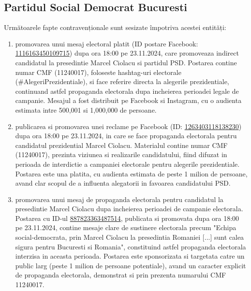 \documentclass[a4paper,12pt]{article}
\begin{document}
\subsection{Partidul Social Democrat Bucuresti}
Următoarele fapte contravenționale sunt sesizate împotriva acestei entități:

\begin{enumerate}[leftmargin=*, label=\arabic*.)]
    \item promovarea unui mesaj electoral platit (ID postare Facebook: \href{https://www.facebook.com/ads/library/?id=1116163450109715}{1116163450109715}) dupa ora 18:00 pe 23.11.2024, care promoveaza indirect candidatul la presedintie Marcel Ciolacu si partidul PSD. Postarea contine numar CMF (11240017), foloseste hashtag-uri electorale (\#AlegeriPrezidentiale), si face referire directa la alegerile prezidentiale, continuand astfel propaganda electorala dupa incheierea perioadei legale de campanie. Mesajul a fost distribuit pe Facebook si Instagram, cu o audienta estimata intre 500,001 si 1,000,000 de persoane.
    \item publicarea si promovarea unei reclame pe Facebook (ID: \href{https://www.facebook.com/ads/library/?id=1263403118138230}{1263403118138230}) dupa ora 18:00 pe 23.11.2024, in care se face propaganda electorala pentru candidatul prezidential Marcel Ciolacu. Materialul contine numar CMF (11240017), prezinta viziunea si realizarile candidatului, fiind difuzat in perioada de interdictie a campaniei electorale pentru alegerile prezidentiale. Postarea este una platita, cu audienta estimata de peste 1 milion de persoane, avand clar scopul de a influenta alegatorii in favoarea candidatului PSD.
    \item promovarea unui mesaj de propaganda electorala pentru candidatul la presedintie Marcel Ciolacu dupa incheierea perioadei de campanie electorala. Postarea cu ID-ul \href{https://www.facebook.com/ads/library/?id=887823363487514}{887823363487514}, publicata si promovata dupa ora 18:00 pe 23.11.2024, contine mesaje clare de sustinere electorala precum "Echipa social-democrata, prin Marcel Ciolacu la presedintia Romaniei [...] sunt calea sigura pentru Bucuresti si Romania", constituind astfel propaganda electorala interzisa in aceasta perioada. Postarea este sponsorizata si targetata catre un public larg (peste 1 milion de persoane potentiale), avand un caracter explicit de propaganda electorala, demonstrat si prin prezenta numarului CMF 11240017.
\end{enumerate}
\end{document}

